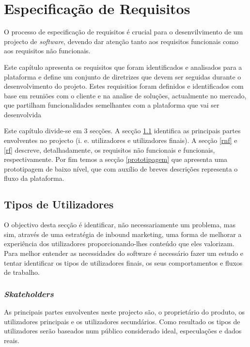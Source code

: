 \chapter{Especificação de Requisitos}
\label{sec:requisitos}



O processo de especificação de requisitos é crucial para o desenvilvimento de um projecto de \textit{software}, devendo dar atenção tanto aos requisitos funcionais como aos requisitos não funcionais.

Este capítulo apresenta os requisitos que foram identificados e analisados para a plataforma e define um conjunto de diretrizes que devem ser seguidas durante o desenvolvimento do projeto. Estes requisitios foram definidos e identificados com base em reuniões com o cliente e na analise de soluções, actualmente no mercado, que partilham funcionalidades semelhantes com a plataforma que vai ser desenvolvida

Este capítulo divide-se em 3 secções. A secção \ref{requisitos:tiposutilizadores} identifica as principais partes envolventes no projecto (i. e. utilizadores e utilizadores finais). A secção \ref{rnf} e \ref{rf} descreve, detalhadamente, os requisitos não funcionais e funcionais, respectivamente. Por fim temos a secção \ref{prototipagem} que apresenta uma prototipagem de baixo nível, que com auxílio de breves descrições representa o fluxo da plataforma.


\section{Tipos de Utilizadores}
\label{requisitos:tiposutilizadores}

O objectivo desta secção é identificar, não necessariamente um problema, mas sim, através de uma estratégia de inbound marketing, uma forma de melhorar a experiência dos utilizadores proporcionando-lhes conteúdo que eles valorizam. Para melhor entender as necessidades do software é necessário fazer um estudo e tentar identificar os tipos de utilizadores finais, os seus comportamentos e fluxos de trabalho.


\subsection{\textit{Skateholders}}

As principais partes envolventes neste projecto são, o proprietário do produto, os utilizadores principais e os utilizadores secundários. Como resultado os tipos de utilizadores serão baseados num público considerado  ideal, especulações e dados reais.


